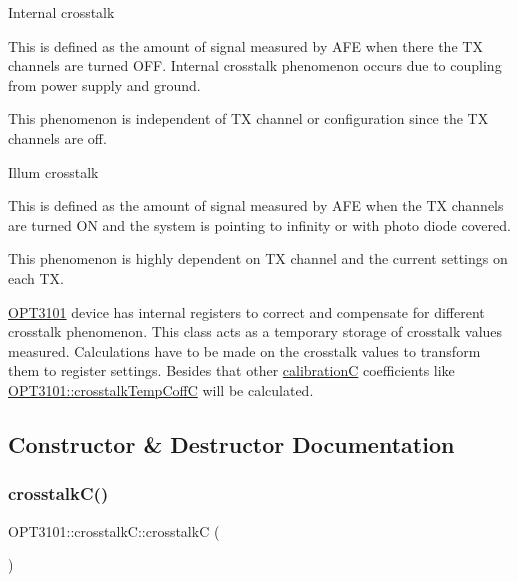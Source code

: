 \begin{DoxyEnumerate}
\item Internal crosstalk
\begin{DoxyEnumerate}
\item This is defined as the amount of signal measured by A\+FE when there the TX channels are turned O\+FF. Internal crosstalk phenomenon occurs due to coupling from power supply and ground.~\newline

\item This phenomenon is independent of TX channel or configuration since the TX channels are off.
\end{DoxyEnumerate}
\item Illum crosstalk
\begin{DoxyEnumerate}
\item This is defined as the amount of signal measured by A\+FE when the TX channels are turned ON and the system is pointing to infinity or with photo diode covered.
\item This phenomenon is highly dependent on TX channel and the current settings on each TX.
\end{DoxyEnumerate}
\end{DoxyEnumerate}

\mbox{\hyperlink{namespace_o_p_t3101}{O\+P\+T3101}} device has internal registers to correct and compensate for different crosstalk phenomenon. This class acts as a temporary storage of crosstalk values measured. Calculations have to be made on the crosstalk values to transform them to register settings. Besides that other \mbox{\hyperlink{class_o_p_t3101_1_1calibration_c}{calibrationC}} coefficients like \mbox{\hyperlink{class_o_p_t3101_1_1crosstalk_temp_coff_c}{O\+P\+T3101\+::crosstalk\+Temp\+CoffC}} will be calculated. 

\subsection{Constructor \& Destructor Documentation}
\mbox{\label{class_o_p_t3101_1_1crosstalk_c_a2b568d4391bfb9a92bbe74e88140bec0}} 
\subsubsection{\texorpdfstring{crosstalk\+C()}{crosstalkC()}}
{\footnotesize\ttfamily O\+P\+T3101\+::crosstalk\+C\+::crosstalkC (\begin{DoxyParamCaption}{ }\end{DoxyParamCaption})}




